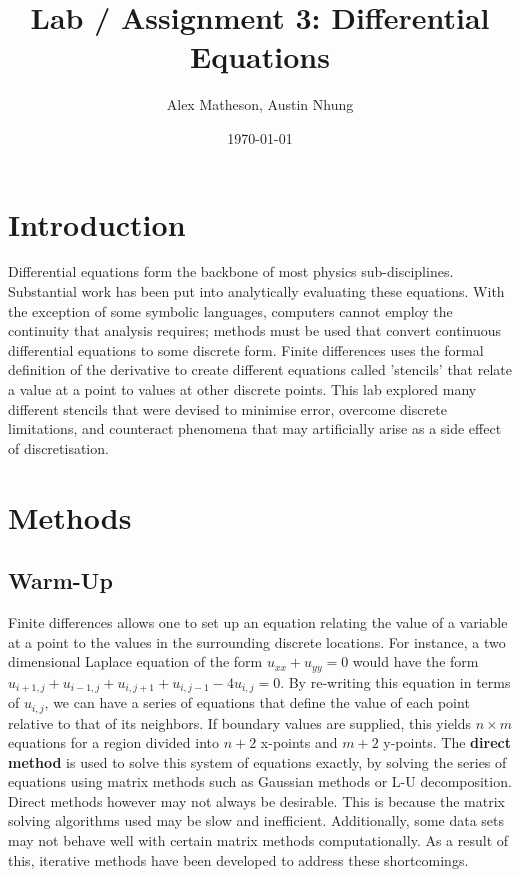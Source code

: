 \documentclass[twocolumn]{article}
\begin{document}
\title{Lab / Assignment 3: Differential Equations}
\author{Alex Matheson, Austin Nhung}
\date{\today}
\maketitle

\section{Introduction}
Differential equations form the backbone of most physics sub-disciplines. Substantial work has been put into analytically evaluating these equations. With the exception of some symbolic languages, computers cannot employ the continuity that analysis requires; methods must be used that convert continuous differential equations to some discrete form. Finite differences uses the formal definition of the derivative to create different equations called 'stencils' that relate a value at a point to values at other discrete points. This lab explored many different stencils that were devised to minimise error, overcome discrete limitations, and counteract phenomena that may artificially arise as a side effect of discretisation. 

\section{Methods}
\subsection{Warm-Up}
Finite differences allows one to set up an equation relating the value of a variable at a point to the values in the surrounding discrete locations. For instance, a two dimensional Laplace equation of the form $u_{xx} + u_{yy} = 0$ would have the form $u_{i+1,j} + u_{i-1,j} + u_{i,j+1} + u_{i,j-1} - 4u_{i,j} = 0$. By re-writing this equation in terms of $u_{i,j}$, we can have a series of equations that define the value of each point relative to that of its neighbors. If boundary values are supplied, this yields $n\times m$ equations for a region divided into $n+2$ x-points and $m+2$ y-points. The \textbf{direct method} is used to solve this system of equations exactly, by solving the series of equations using matrix methods such as Gaussian methods or L-U decomposition. Direct methods however may not always be desirable. This is because the matrix solving algorithms used may be slow and inefficient. Additionally, some data sets may not behave well with certain matrix methods computationally. As a result of this, iterative methods have been developed to address these shortcomings.
\end{document}
